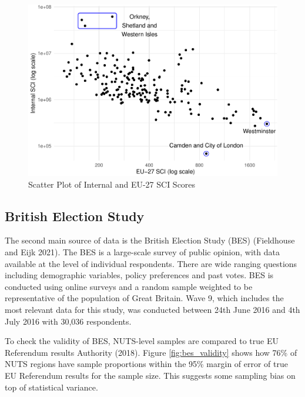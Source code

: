 \documentclass{article}
\begin{document}
\begin{figure}

{\centering \includegraphics[width=0.8\linewidth]{SCI-and-Leave-Voting_files/figure-latex/scatter-1} 

}

\caption{\label{fig:scatter}Scatter Plot of Internal and EU-27 SCI Scores}\label{fig:scatter}
\end{figure}

\hypertarget{british-election-study}{%
\subsection{British Election Study}\label{british-election-study}}

The second main source of data is the British Election Study (BES)
(Fieldhouse and Eijk 2021). The BES is a large-scale survey of public
opinion, with data available at the level of individual respondents.
There are wide ranging questions including demographic variables, policy
preferences and past votes. BES is conducted using online surveys and a
random sample weighted to be representative of the population of Great
Britain. Wave 9, which includes the most relevant data for this study,
was conducted between 24th June 2016 and 4th July 2016 with 30,036
respondents.

To check the validity of BES, NUTS-level samples are compared to true EU
Referendum results Authority (2018). Figure \ref{fig:bes_validity} shows
how 76\% of NUTS regions have sample proportions within the 95\% margin
of error of true EU Referendum results for the sample size. This
suggests some sampling bias on top of statistical variance.
\end{document}

